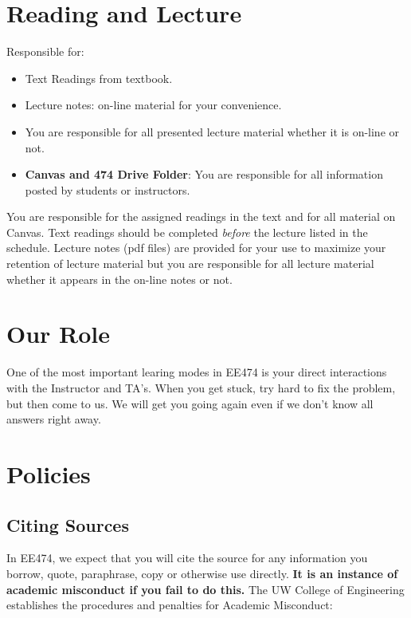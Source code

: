 \section{Reading and Lecture}

Responsible for:
\begin{itemize}
        \item Text Readings from textbook.
        \item Lecture notes:  on-line material for your convenience.
        \item You are responsible for all presented lecture material whether it
        is on-line or not.
        \item {\bf Canvas and 474 Drive Folder}:
        You are responsible for all information posted by students or instructors.
\end{itemize}

You are responsible for the assigned readings in the text and for all
material on Canvas.    Text readings should
be completed {\it before} the lecture listed in the schedule.
Lecture notes (pdf files) are provided for your use to maximize your retention
 of lecture material but you are responsible for all lecture material whether
 it appears in the on-line notes or not.



\section{Our Role}
One of the most important learing modes in EE474 is your direct interactions
with the Instructor and TA's.
When you get stuck, try hard to fix the problem, but then come to us.
We will get you going again even if we don't know all answers right away.


\section{Policies}

\subsection{Citing Sources}

In EE474, we expect that you will cite the source for
any information you borrow, quote, paraphrase, copy or otherwise use directly.
{\bf It is an instance of academic misconduct if you fail to do this.}
The UW College of Engineering establishes the procedures and penalties for
Academic Misconduct:

